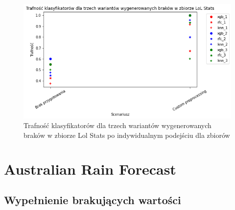 \documentclass{book}
\begin{document}
    \begin{figure}[H]
        \centerline{\includegraphics[scale=0.8]{Lol_stats_Custom}}
        \centering
        \caption{Trafność klasyfikatorów dla trzech wariantów wygenerowanych braków w zbiorze Lol Stats po indywidualnym podejściu dla zbiorów}
        \end{figure}


\section{Australian Rain Forecast}


\subsection{Wypełnienie brakujących wartości}
\end{document}
